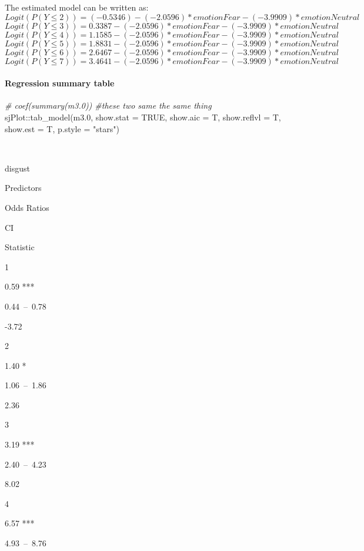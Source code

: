 \documentclass[
]{article}
\newenvironment{Shaded}{\begin{snugshade}}{\end{snugshade}}
\newcommand{\AttributeTok}[1]{\textcolor[rgb]{0.77,0.63,0.00}{#1}}
\newcommand{\CommentTok}[1]{\textcolor[rgb]{0.56,0.35,0.01}{\textit{#1}}}
\newcommand{\ConstantTok}[1]{\textcolor[rgb]{0.00,0.00,0.00}{#1}}
\newcommand{\FloatTok}[1]{\textcolor[rgb]{0.00,0.00,0.81}{#1}}
\newcommand{\FunctionTok}[1]{\textcolor[rgb]{0.00,0.00,0.00}{#1}}
\newcommand{\NormalTok}[1]{#1}
\newcommand{\SpecialCharTok}[1]{\textcolor[rgb]{0.00,0.00,0.00}{#1}}
\newcommand{\StringTok}[1]{\textcolor[rgb]{0.31,0.60,0.02}{#1}}
\begin{document}
The estimated model can be written as:
\[Logit(P(Y\le 2))= (-0.5346) - (-2.0596)*emotionFear - (-3.9909)*emotionNeutral\]
\[Logit(P(Y\le 3))= 0.3387 - (-2.0596)*emotionFear - (-3.9909)*emotionNeutral\]
\[Logit(P(Y\le 4))= 1.1585 - (-2.0596)*emotionFear - (-3.9909)*emotionNeutral\]
\[Logit(P(Y\le 5))= 1.8831 - (-2.0596)*emotionFear - (-3.9909)*emotionNeutral\]
\[Logit(P(Y\le 6))= 2.6467 - (-2.0596)*emotionFear - (-3.9909)*emotionNeutral\]
\[Logit(P(Y\le 7))= 3.4641 - (-2.0596)*emotionFear - (-3.9909)*emotionNeutral\]

\hypertarget{regression-summary-table}{%
\paragraph{Regression summary table}\label{regression-summary-table}}

\begin{Shaded}
\begin{Highlighting}[]
\CommentTok{\# coef(summary(m3.0)) \#these  two same the same thing}
\NormalTok{sjPlot}\SpecialCharTok{::}\FunctionTok{tab\_model}\NormalTok{(m3}\FloatTok{.0}\NormalTok{, }\AttributeTok{show.stat =} \ConstantTok{TRUE}\NormalTok{, }\AttributeTok{show.aic =}\NormalTok{ T, }\AttributeTok{show.reflvl =}\NormalTok{ T, }\AttributeTok{show.est =}\NormalTok{ T, }\AttributeTok{p.style =} \StringTok{"stars"}\NormalTok{)}
\end{Highlighting}
\end{Shaded}

~

disgust

Predictors

Odds Ratios

CI

Statistic

1

0.59 ***

0.44~--~0.78

-3.72

2

1.40 *

1.06~--~1.86

2.36

3

3.19 ***

2.40~--~4.23

8.02

4

6.57 ***

4.93~--~8.76
\end{document}
